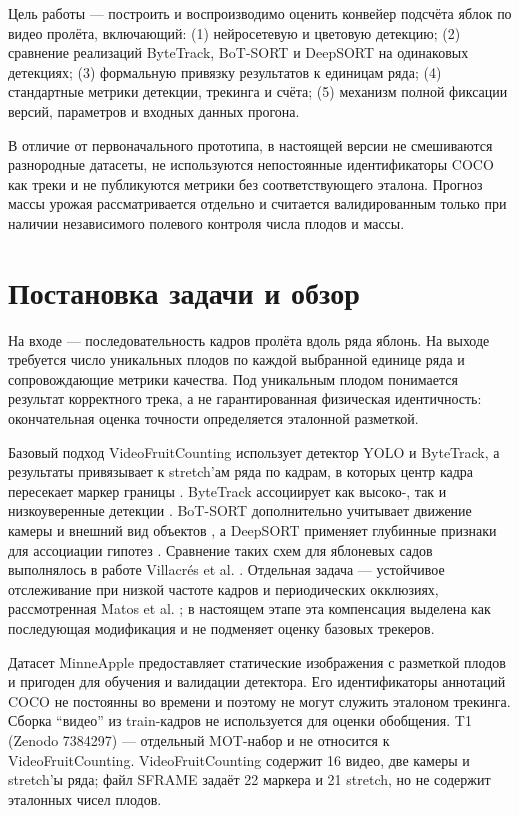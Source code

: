\documentclass[12pt,a4paper]{article}
\begin{document}
Цель работы --- построить и воспроизводимо оценить конвейер подсчёта
яблок по видео пролёта, включающий: (1) нейросетевую и цветовую детекцию;
(2) сравнение реализаций ByteTrack, BoT-SORT и DeepSORT на одинаковых
детекциях; (3) формальную привязку результатов к единицам ряда;
(4) стандартные метрики детекции, трекинга и счёта; (5) механизм полной
фиксации версий, параметров и входных данных прогона.

В отличие от первоначального прототипа, в настоящей версии не смешиваются
разнородные датасеты, не используются непостоянные идентификаторы COCO как
треки и не публикуются метрики без соответствующего эталона. Прогноз массы
урожая рассматривается отдельно и считается валидированным только при
наличии независимого полевого контроля числа плодов и массы.

\section{Постановка задачи и обзор}

На входе --- последовательность кадров пролёта вдоль ряда яблонь. На выходе
требуется число уникальных плодов по каждой выбранной единице ряда и
сопровождающие метрики качества. Под уникальным плодом понимается
результат корректного трека, а не гарантированная физическая идентичность:
окончательная оценка точности определяется эталонной разметкой.

Базовый подход VideoFruitCounting использует детектор YOLO и ByteTrack, а
результаты привязывает к stretch'ам ряда по кадрам, в которых центр кадра
пересекает маркер границы \cite{felip2026videofruit}. ByteTrack ассоциирует
как высоко-, так и низкоуверенные детекции \cite{zhang2021bytetrack}.
BoT-SORT дополнительно учитывает движение камеры и внешний вид объектов
\cite{aharon2022botsort}, а DeepSORT применяет глубинные признаки для
ассоциации гипотез \cite{wojke2017deepsort}. Сравнение таких схем для
яблоневых садов выполнялось в работе Villacrés et al.
\cite{villacres2023apple}. Отдельная задача --- устойчивое отслеживание
при низкой частоте кадров и периодических окклюзиях, рассмотренная Matos
et al. \cite{matos2024tracking}; в настоящем этапе эта компенсация выделена
как последующая модификация и не подменяет оценку базовых трекеров.

Датасет MinneApple \cite{haeni2019minneapple} предоставляет статические
изображения с разметкой плодов и пригоден для обучения и валидации
детектора. Его идентификаторы аннотаций COCO не постоянны во времени и
поэтому не могут служить эталоном трекинга. Сборка ``видео'' из train-кадров
не используется для оценки обобщения. T1 (Zenodo 7384297) --- отдельный
MOT-набор и не относится к VideoFruitCounting. VideoFruitCounting содержит
16 видео, две камеры и stretch'ы ряда; файл SFRAME задаёт 22 маркера и 21
stretch, но не содержит эталонных чисел плодов.
\end{document}
